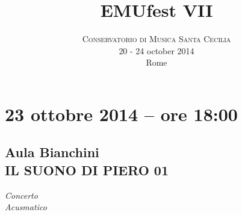 \documentclass[8pt, twoside, a5paper]{extreport}
\title{\vspace{-15mm}\fontsize{50}{60}\selectfont\textbf{EMUfest VII}} %
\author{
\large
\textsc{Conservatorio di Musica Santa Cecilia}\\[2mm] %
\normalsize 20 - 24 october 2014 \\ %
\normalsize Rome %
\vspace{-5mm}
}
\date{}
\begin{document}
\pagestyle{empty}
\maketitle %


\section*{23 ottobre 2014 -- ore 18:00}
\subsection*{\textsf{Aula Bianchini\\
	{\small IL SUONO DI PIERO 01\\}}}

{\fontsize{50}{60}\selectfont \textit{Concerto\\ Acusmatico}}
\bigskip


\section*{}
	
\end{document}
